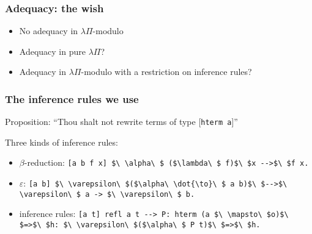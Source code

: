 \begin{frame}
\frametitle{Adequacy: the wish}

\begin{itemize}
\item No adequacy in $\lambda\Pi$-modulo
\item Adequacy in pure $\lambda\Pi$?
\item Adequacy in $\lambda\Pi$-modulo with a restriction on inference
  rules?
\end{itemize}

\end{frame}


\begin{frame}
\frametitle{The inference rules we use}

\begin{block}{Proposition:}
  ``Thou shalt not rewrite terms of type [\lstinline!hterm a!]''
\end{block}

\pause

\begin{block}{Three kinds of inference rules:}
\begin{itemize}
\item $\beta$-reduction: \lstinline![a b f x] $\ \alpha\ $ ($\lambda\ $ f)$\ $x -->$\ $f x.! 
\item $\varepsilon$: \lstinline![a b] $\ \varepsilon\ $($\alpha\ \dot{\to}\ $ a b)$\ $-->$\ \varepsilon\ $ a -> $\ \varepsilon\ $ b.! 
\item inference rules: \lstinline![a t] refl a t --> P: hterm (a $\ \mapsto\ $o)$\ $=>$\ $h: $\ \varepsilon\ $($\alpha\ $ P t)$\ $=>$\ $h.! 
\end{itemize}
\end{block}

\end{frame}
